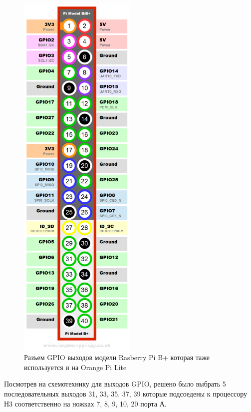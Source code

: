 \begin{figure}[h!]
    \centering
    \includegraphics[width=0.5\textwidth]{Raspberry-Pi-B-Plus.png}
    \caption{Разъем GPIO выходов модели Rasberry Pi B+ которая таже используется и на Orange Pi Lite}
\end{figure}

Посмотрев на схемотехнику для выходов GPIO, решено было выбрать 5 последовательных 
выходов 31, 33, 35, 37, 39 которые подсоедены к процессору Н3 соответственно на ножках 7, 8, 9, 10, 20 порта А.

